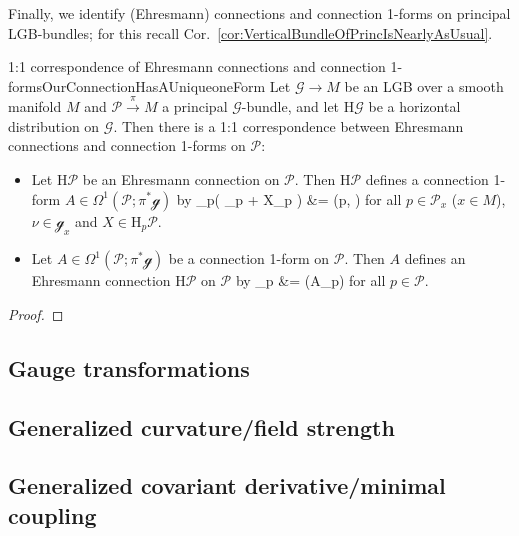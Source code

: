 \documentclass[a4paper,oneside,11pt,bibliography=totoc]{scrartcl}
\def\bas#1\eas{\begin{align*}#1\end{align*}}
\theoremstyle{plain}
\theoremstyle{remark}
\theoremstyle{definition}
\begin{document}
Finally, we identify (Ehresmann) connections and connection 1-forms on principal LGB-bundles; for this recall Cor.\ \ref{cor:VerticalBundleOfPrincIsNearlyAsUsual}.

\begin{theorems}{1:1 correspondence of Ehresmann connections and connection 1-forms}{OurConnectionHasAUniqueoneForm}
Let $\mathcal{G} \to M$ be an LGB over a smooth manifold $M$ and $\mathcal{P} \stackrel{\pi}{\to} M$ a principal $\mathcal{G}$-bundle, and let $\mathrm{H}\mathcal{G}$ be a horizontal distribution on $\mathcal{G}$. Then there is a 1:1 correspondence between Ehresmann connections and connection 1-forms on $\mathcal{P}$:
\begin{itemize}
	\item Let $\mathrm{H}\mathcal{P}$ be an Ehresmann connection on $\mathcal{P}$. Then $\mathrm{H}\mathcal{P}$ defines a connection 1-form $A \in \Omega^1(\mathcal{P}; \pi^*\mathcal{g})$ by
	\bas
	A_p\bigl( \widetilde{\nu}_p + X_p \bigr)
	&=
	(p, \nu)
	\eas
	for all $p \in \mathcal{P}_x$ ($x \in M$), $\nu \in \mathcal{g}_x$ and $X \in \mathrm{H}_p\mathcal{P}$.
	\item Let $A \in \Omega^1(\mathcal{P}; \pi^*\mathcal{g})$ be a connection 1-form on $\mathcal{P}$. Then $A$ defines an Ehresmann connection $\mathrm{H}\mathcal{P}$ on $\mathcal{P}$ by
	\bas
	\mathrm{H}_p\mathcal{P}
	&=
	(A_p)
	\eas
	for all $p \in {}$.
\end{itemize}
\end{theorems}

\begin{proof}
\leavevmode\newline

\end{proof}

\subsection{Gauge transformations}

\subsection{Generalized curvature/field strength}

\subsection{Generalized covariant derivative/minimal coupling}
\end{document}
